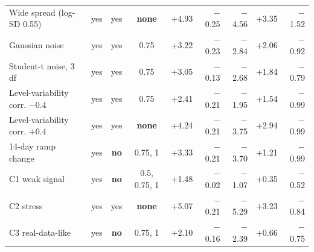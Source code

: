 \begin{table}[H]
\begin{tabular}{@{}lcccrrrrr@{}}
Wide spread (log-SD 0.55) & yes & yes & \textbf{none} & +4.93 & $-$0.25 & $-$4.56 & +3.35 & $-$1.52 \\
Gaussian noise & yes & yes & 0.75 & +3.22 & $-$0.23 & $-$2.84 & +2.06 & $-$0.92 \\
Student-t noise, 3 df & yes & yes & 0.75 & +3.05 & $-$0.13 & $-$2.68 & +1.84 & $-$0.79 \\
Level-variability corr. $-0.4$ & yes & yes & 0.75 & +2.41 & $-$0.21 & $-$1.95 & +1.54 & $-$0.99 \\
Level-variability corr. $+0.4$ & yes & yes & \textbf{none} & +4.24 & $-$0.21 & $-$3.75 & +2.94 & $-$0.99 \\
14-day ramp change & yes & \textbf{no} & 0.75, 1 & +3.33 & $-$0.21 & $-$3.70 & +1.21 & $-$0.99 \\
\midrule
C1 weak signal & yes & \textbf{no} & 0.5, 0.75, 1 & +1.48 & $-$0.02 & $-$1.07 & +0.35 & $-$0.52 \\
C2 stress & yes & yes & \textbf{none} & +5.07 & $-$0.21 & $-$5.29 & +3.23 & $-$0.84 \\
C3 real-data-like & yes & \textbf{no} & 0.75, 1 & +2.10 & $-$0.16 & $-$2.39 & +0.66 & $-$0.75 \\
\bottomrule
\end{tabular}
\end{table}
